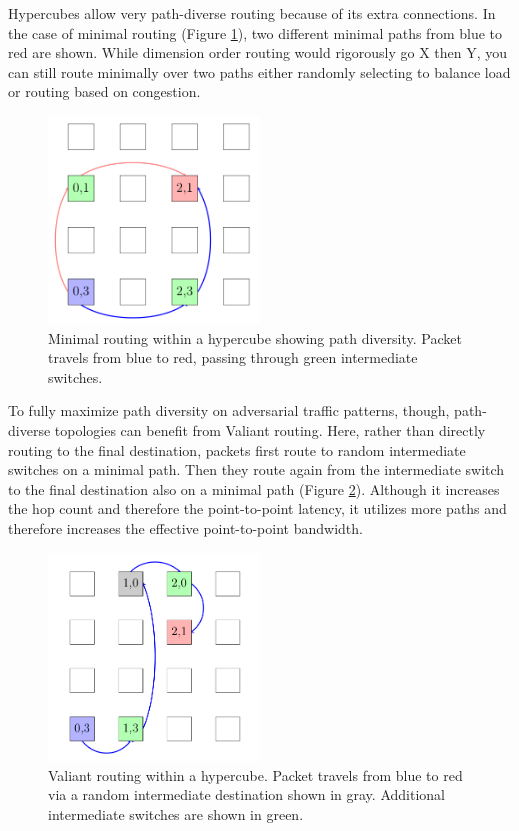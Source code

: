 Hypercubes allow very path-diverse routing because of its extra connections.
In the case of minimal routing (Figure \ref{fig:topologies:hypercubePath}), two different minimal paths from blue to red are shown.
While dimension order routing would rigorously go X then Y, you can still route minimally over two paths either randomly selecting to balance load or routing based on congestion.

\begin{figure}[h!]
\centering
\includegraphics[width=0.5\textwidth]{figures/tikz/hypercube/hypercube_path.png}
\caption{Minimal routing within a hypercube showing path diversity. Packet travels from blue to red, passing through green intermediate switches.}
\label{fig:topologies:hypercubePath}
\end{figure}

To fully maximize path diversity on adversarial traffic patterns, though, path-diverse topologies can benefit from Valiant routing.
Here, rather than directly routing to the final destination, packets first route to random intermediate switches on a minimal path.
Then they route again from the intermediate switch to the final destination also on a minimal path (Figure \ref{fig:topologies:hypercubeValiant}).
Although it increases the hop count and therefore the point-to-point latency, it utilizes more paths and therefore increases the effective point-to-point bandwidth.

\begin{figure}[h!]
\centering
\includegraphics[width=0.5\textwidth]{figures/tikz/hypercube/hypercube_valiant.png}
\caption{Valiant routing within a hypercube.  Packet travels from blue to red via a random intermediate destination shown in gray. Additional intermediate switches are shown in green.}
\label{fig:topologies:hypercubeValiant}
\end{figure}
